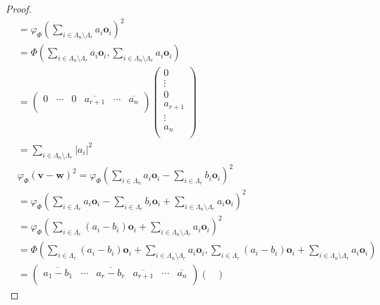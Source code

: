 \documentclass[dvipdfmx]{jsarticle}
\begin{document}
\begin{proof}
\begin{align*}
&= {\varphi_{\varPhi }\left( \sum_{i \in \varLambda_{n} \setminus \varLambda_{r}} {a_{i}\mathbf{o}_{i}} \right)}^{2}\\
&= \varPhi \left( \sum_{i \in \varLambda_{n} \setminus \varLambda_{r}} {a_{i}\mathbf{o}_{i}},\sum_{i \in \varLambda_{n} \setminus \varLambda_{r}} {a_{i}\mathbf{o}_{i}} \right)\\
&= \begin{pmatrix}
0 & \cdots & 0 & \overline{a_{r + 1}} & \cdots & \overline{a_{n}} \\
\end{pmatrix}\begin{pmatrix}
0 \\
 \vdots \\
0 \\
a_{r + 1} \\
 \vdots \\
a_{n} \\
\end{pmatrix}\\
&= \sum_{i \in \varLambda_{n} \setminus \varLambda_{r}} \left| a_{i} \right|^{2}\\
&{\varphi_{\varPhi }\left( \mathbf{v} - \mathbf{w} \right)}^{2} = {\varphi_{\varPhi }\left( \sum_{i \in \varLambda_{n}} {a_{i}\mathbf{o}_{i}} - \sum_{i \in \varLambda_{r}} {b_{i}\mathbf{o}_{i}} \right)}^{2}\\
&= {\varphi_{\varPhi }\left( \sum_{i \in \varLambda_{r}} {a_{i}\mathbf{o}_{i}} - \sum_{i \in \varLambda_{r}} {b_{i}\mathbf{o}_{i}} + \sum_{i \in \varLambda_{n} \setminus \varLambda_{r}} {a_{i}\mathbf{o}_{i}} \right)}^{2}\\
&= {\varphi_{\varPhi }\left( \sum_{i \in \varLambda_{r}} {\left( a_{i} - b_{i} \right)\mathbf{o}_{i}} + \sum_{i \in \varLambda_{n} \setminus \varLambda_{r}} {a_{i}\mathbf{o}_{i}} \right)}^{2}\\
&= \varPhi \left( \sum_{i \in \varLambda_{r}} {\left( a_{i} - b_{i} \right)\mathbf{o}_{i}} + \sum_{i \in \varLambda_{n} \setminus \varLambda_{r}} {a_{i}\mathbf{o}_{i}},\sum_{i \in \varLambda_{r}} {\left( a_{i} - b_{i} \right)\mathbf{o}_{i}} + \sum_{i \in \varLambda_{n} \setminus \varLambda_{r}} {a_{i}\mathbf{o}_{i}} \right)\\
&= \begin{pmatrix}
\overline{a_{1} - b_{1}} & \cdots & \overline{a_{r} - b_{r}} & \overline{a_{r + 1}} & \cdots & \overline{a_{n}} \\
\end{pmatrix}\begin{pmatrix}

\end{pmatrix}
\end{align*}
\end{proof}
\end{document}
